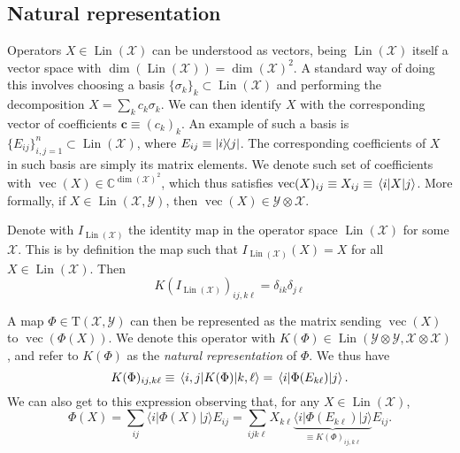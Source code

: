 \documentclass[12pt]{report}
\newcommand{\CC}{\mathbb{C}}
\newcommand{\on}[1]{\operatorname{#1}}
\newcommand{\bs}[1]{\boldsymbol{#1}}
\newcommand{\calY}{{\mathcal{Y}}}
\newcommand{\calX}{{\mathcal{X}}}
\newcommand{\rmT}{{\mathrm{T}}}
\DeclareMathOperator{\Lin}{Lin}
\begin{document}
\subsection{Natural representation}

Operators $X\in\Lin(\calX)$ can be understood as vectors, being $\Lin(\calX)$ itself a vector space with $\dim(\Lin(\calX))=\dim(\calX)^2$. A standard way of doing this involves choosing a basis $\{\sigma_k\}_k\subset\Lin(\calX)$ and performing the decomposition $X=\sum_k c_k\sigma_k$. We can then identify $X$ with the corresponding vector of coefficients $\bs c\equiv (c_k)_k$.
An example of such a basis is $\{E_{ij}\}_{i,j=1}^n\subset\Lin(\calX)$, where $E_{ij}\equiv \ketbra{i}{j}$.
The corresponding coefficients of $X$ in such basis are simply its matrix elements. We denote such set of coefficients with $\on{vec}(X)\in\CC^{\dim(\calX)^2}$, which thus satisfies
	$\on{vec}(X)_{ij} \equiv X_{ij} \equiv \mel{i}{X}{j}$.
More formally, if $X\in\Lin(\calX,\calY)$, then $\on{vec}(X)\in\calY\otimes\calX$.

\begin{example}
	Denote with $I_{\Lin(\calX)}$ the identity map in the operator space $\Lin(\calX)$ for some $\calX$. This is by definition the map such that $I_{\Lin(\calX)}(X)=X$ for all $X\in\Lin(\calX)$.
	Then
	\begin{equation}
		K(I_{\Lin(\calX)})_{ij,k\ell}
		= \delta_{ik}\delta_{j\ell}
	\end{equation}
\end{example}

A map $\Phi\in\rmT(\calX,\calY)$ can then be represented as the matrix sending $\on{vec}(X)$ to $\on{vec}(\Phi(X))$. We denote this operator with $K(\Phi)\in\Lin(\calY\otimes\calY,\calX\otimes\calX)$, and refer to $K(\Phi)$ as the \emph{natural representation} of $\Phi$.
We thus have
\begin{equation}
	K(\Phi)_{ij,k\ell}
	\equiv \mel{i,j}{K(\Phi)}{k,\ell}
	= \mel{i}{\Phi(E_{k\ell})}{j}.
\end{equation}
We can also get to this expression observing that, for any $X\in\Lin(\calX)$,
\begin{equation}
	\Phi(X)
	= \sum_{ij} \langle i|\Phi(X) |j\rangle E_{ij}
	= \sum_{ijk\ell} X_{k\ell}
	\underbrace{\langle i|\Phi(E_{k\ell})|j\rangle}_{\equiv K(\Phi)_{ij,k\ell}} E_{ij}.
\end{equation}
\end{document}
